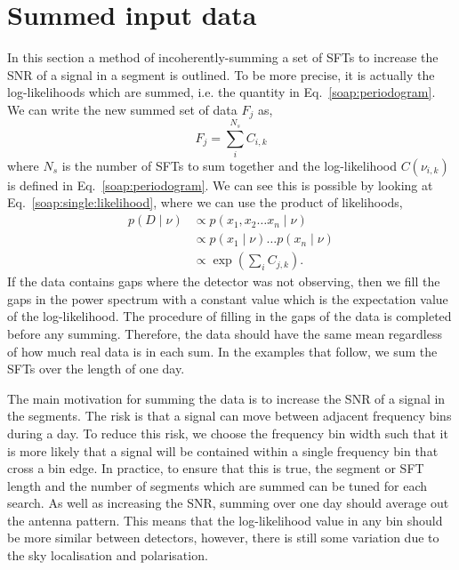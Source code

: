 \section{\label{soap:sumdata}Summed input data}
%
%
In this section a method of incoherently-summing a set of \glspl{SFT} to increase the \gls{SNR} of a signal in a segment is outlined. To be more precise, it is actually the log-likelihoods which are summed, i.e. the quantity in Eq.~\ref{soap:periodogram}. We can write the new summed set of data $F_j$ as,
%
\begin{equation}
F_j = \sum_{i}^{N_s}C_{i,k}
\end{equation}
%
where $N_s$ is the number of \glspl{SFT} to sum together and the log-likelihood $C(\nu_{i,k})$ is defined in Eq.~\ref{soap:periodogram}.
We can see this is possible by looking at Eq.~\ref{soap:single:likelihood}, where we can use the product of likelihoods,
%
\begin{equation}
\begin{split}
p(D \mid \nu) &\propto p(x_1,x_2 \ldots x_n \mid \nu) \\
&\propto p(x_1 \mid \nu) \ldots p(x_n \mid \nu) \\
&\propto \exp{\left( \sum_i C_{j,k}\right)}.
\end{split}
\end{equation}
%
If the data contains gaps where the detector was not observing, then we fill the gaps in the power spectrum with a constant value which is the expectation value of the log-likelihood. The procedure of filling in the gaps of the data is completed before any summing.  Therefore, the data should have the same mean regardless of how much real data is in each sum. In the examples that follow, we sum the \glspl{SFT} over the length of one day.

The main motivation for summing the data is to increase the \gls{SNR} of a signal in the segments. The risk is that a signal can move between adjacent frequency bins during a day. To reduce this risk, we choose the frequency bin width such that it is more likely that a signal will be contained within a single frequency bin that cross a bin edge. In practice, to ensure that this is true, the segment or \gls{SFT} length and the number of segments which are summed can be tuned for each search. As well as increasing the \gls{SNR}, summing over one day should average out the antenna pattern. This means that the log-likelihood value in any bin should be more similar between detectors, however, there is still some variation due to the sky localisation and polarisation.

